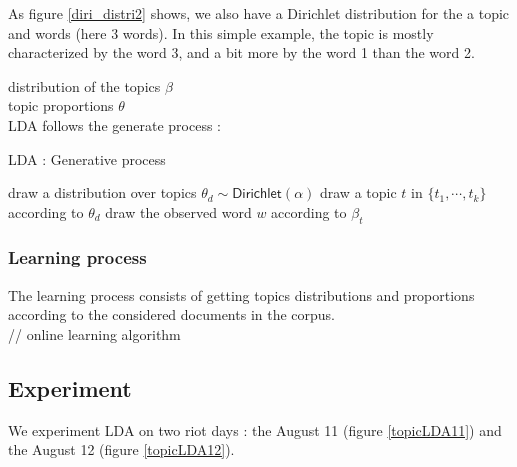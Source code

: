 \documentclass[a4paper,twoside,12pt,openright]{report}
\begin{document}
As figure \ref{diri_distri2} shows, we also have a Dirichlet distribution for the a topic and words (here 3 words). In this simple example, the topic is mostly characterized by the word 3, and a bit more by the word 1 than the word 2.

distribution of the topics $\beta$\\
topic proportions $\theta$\\

LDA follows the generate process : 
\begin{algorithm}
\caption{LDA : Generative process}
\label{algo:hashtagsGraph}
\begin{algorithmic} 
\STATE draw a distribution over topics $\theta_d \sim \textsf{Dirichlet}(\alpha)$
\STATE draw a topic $t$ in $\{t_1,\cdots,t_k\}$ according to $\theta_d$
\STATE draw the observed word $w$ according to $\beta_t$
\ENDFOR
\ENDFOR
\\[10pt]
\end{algorithmic}
\end{algorithm}

\subsubsection{Learning process}
The learning process consists of getting topics distributions and proportions according to the considered documents in the corpus.\\

// online learning algorithm 


\newpage

\subsection{Experiment}
We experiment LDA on two riot days : the August 11 (figure \ref{topicLDA11}) and the August 12 (figure \ref{topicLDA12}).
\end{document}

